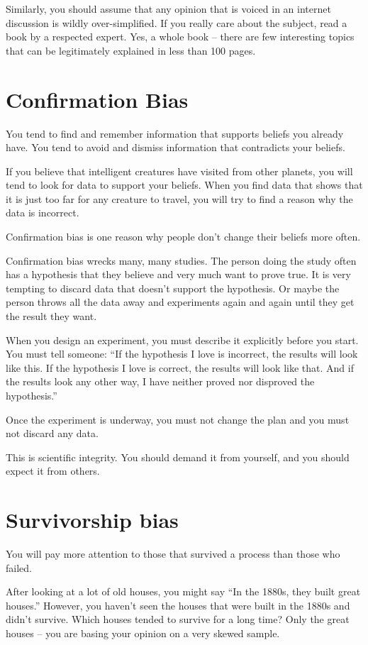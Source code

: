 Similarly, you should assume that any opinion that is voiced in an
internet discussion is wildly over-simplified.  If you really care
about the subject, read a book by a respected expert. Yes, a whole
book -- there are few interesting topics that can be legitimately
explained in less than 100 pages.

\section{Confirmation Bias}

You tend to find and remember information that supports
beliefs you already have. You tend to avoid and dismiss information
that contradicts your beliefs.

If you believe that intelligent creatures have visited from other
planets, you will tend to look for data to support your beliefs. When
you find data that shows that it is just too far for any creature to
travel, you will try to find a reason why the data is incorrect.

Confirmation bias is one reason why people don't change their beliefs
more often.

Confirmation bias wrecks many, many studies. The person doing the
study often has a hypothesis that they believe and very much want to
prove true. It is very tempting to discard data that doesn't support
the hypothesis. Or maybe the person throws all the data away and experiments again and again until they get the result they want.

When you design an experiment, you must describe it explicitly before
you start. You must tell someone: ``If the hypothesis I love is
incorrect, the results will look like this.  If the hypothesis I love
is correct, the results will look like that. And if the results look
any other way, I have neither proved nor disproved the hypothesis.''

Once the experiment is underway, you must not change the plan and you
must not discard any data.

This is scientific integrity. You should demand it from yourself, and
you should expect it from others.

\section{Survivorship bias}

You will pay more attention to those that survived a process than
those who failed.

After looking at a lot of old houses, you might say ``In the 1880s,
they built great houses.'' However, you haven't seen the houses that
were built in the 1880s and didn't survive.  Which houses tended to
survive for a long time? Only the great houses -- you are
basing your opinion on a very skewed sample.

